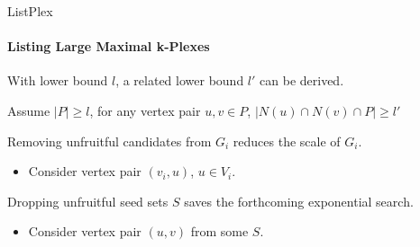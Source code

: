 \documentclass[9pt]{beamer} %
\begin{document}
\begin{frame}{ListPlex}
    \framesubtitle{Listing Large Maximal k-Plexes}
    With lower bound $l$, a related lower bound $l'$ can be derived.
    \begin{lemma}
        Assume $|P|\ge l$, for any vertex pair $u,v \in P$,  $|N(u)\cap N(v) \cap P| \ge l'$
    \end{lemma}
    \vspace{0.25cm}
    Removing unfruitful candidates from $G_i$ reduces the scale of $G_i$.\\
    \begin{itemize}
        \item Consider vertex pair $(v_i,u)$, $u \in V_i$.
    \end{itemize}    
    \vspace{0.25cm}
    Dropping unfruitful seed sets $S$ saves the forthcoming exponential search.
    \begin{itemize}
        \item Consider vertex pair $(u,v)$ from some $S$.
    \end{itemize}       
\end{frame}
    
\end{document}
